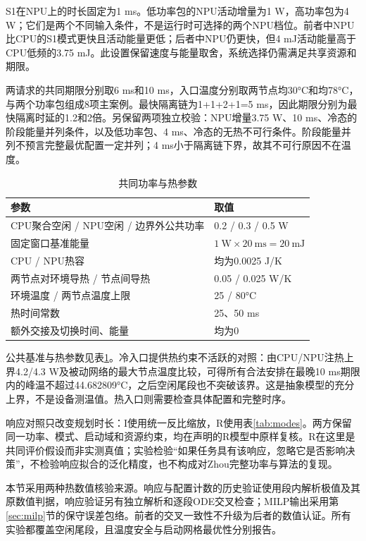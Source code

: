 S1在NPU上的时长固定为1 ms。低功率包的NPU活动增量为1 W，高功率包为4 W；它们是两个不同输入条件，不是运行时可选择的两个NPU档位。前者中NPU比CPU的S1模式更快且活动能量更低；后者中NPU仍更快，但4 mJ活动能量高于CPU低频的3.75 mJ。此设置保留速度与能量取舍，系统选择仍需满足共享资源和期限。

两请求的共同期限分别取6 ms和10 ms，入口温度分别取两节点均30°C和均78°C，与两个功率包组成8项主案例。最快隔离链为1+1+2+1=5 ms，因此期限分别为最快隔离时延的1.2和2倍。另保留两项独立校验：NPU增量3.75 W、10 ms、冷态的阶段能量并列条件，以及低功率包、4 ms、冷态的无热不可行条件。阶段能量并列不预言完整最优配置一定并列；4 ms小于隔离链下界，故其不可行原因不在温度。

\begin{table}[htbp]
\centering\small
\caption{共同功率与热参数}\label{tab:thermal-params}
\begin{tabular}{ll}
\toprule
参数 & 取值\\
\midrule
CPU聚合空闲 / NPU空闲 / 边界外公共功率 & 0.2 / 0.3 / 0.5 W\\
固定窗口基准能量 & $1\ \mathrm W\times20\ \mathrm{ms}=20\ \mathrm{mJ}$\\
CPU / NPU热容 & 均为0.0025 J/K\\
两节点对环境导热 / 节点间导热 & 0.05 / 0.025 W/K\\
环境温度 / 两节点温度上限 & 25 / 80°C\\
热时间常数 & 25、50 ms\\
额外交接及切换时间、能量 & 均为0\\
\bottomrule
\end{tabular}
\end{table}

公共基准与热参数见表\ref{tab:thermal-params}。冷入口提供热约束不活跃的对照：由CPU/NPU注热上界4.2/4.3 W及被动网络的最大节点温度比较，可得所有合法安排在最晚10 ms期限内的峰温不超过44.682809°C，之后空闲尾段也不突破该界。这是抽象模型的充分上界，不是设备测温值。热入口则需要检查具体配置和完整时序。

响应对照只改变规划时长：I使用统一反比缩放，R使用表\ref{tab:modes}。两方保留同一功率、模式、启动域和资源约束，均在声明的R模型中原样复核。R在这里是共同评价假设而非实测真值；实验检验“如果任务具有该响应，忽略它是否影响决策”，不检验响应拟合的泛化精度，也不构成对Zhou完整功率与算法的复现。

本节采用两种热数值核验来源。响应与配置计数的历史验证使用段内解析极值及其原数值判据，响应验证另有独立解析和逐段ODE交叉检查；MILP输出采用第\ref{sec:milp}节的保守误差包络。前者的交叉一致性不升级为后者的数值认证。所有实验都覆盖空闲尾段，且温度安全与启动网格最优性分别报告。

